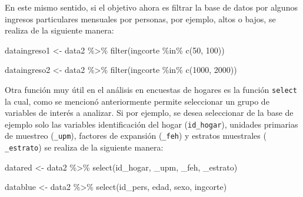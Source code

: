 \documentclass[
  12pt,
]{book}
\newenvironment{Shaded}{\begin{snugshade}}{\end{snugshade}}
\newcommand{\AttributeTok}[1]{\textcolor[rgb]{0.77,0.63,0.00}{#1}}
\newcommand{\DecValTok}[1]{\textcolor[rgb]{0.00,0.00,0.81}{#1}}
\newcommand{\FunctionTok}[1]{\textcolor[rgb]{0.00,0.00,0.00}{#1}}
\newcommand{\NormalTok}[1]{#1}
\newcommand{\OtherTok}[1]{\textcolor[rgb]{0.56,0.35,0.01}{#1}}
\newcommand{\SpecialCharTok}[1]{\textcolor[rgb]{0.00,0.00,0.00}{#1}}
\newcommand{\StringTok}[1]{\textcolor[rgb]{0.31,0.60,0.02}{#1}}
\begin{document}
En este mismo sentido, si el objetivo ahora es filtrar la base de datos por algunos ingresos particulares mensuales por personas, por ejemplo, altos o bajos, se realiza de la siguiente manera:

\begin{Shaded}
\begin{Highlighting}[]
\NormalTok{dataingreso1 }\OtherTok{\textless{}{-}}\NormalTok{ data2 }\SpecialCharTok{\%\textgreater{}\%} 
  \FunctionTok{filter}\NormalTok{(ingcorte }\SpecialCharTok{\%in\%} \FunctionTok{c}\NormalTok{(}\DecValTok{50}\NormalTok{, }\DecValTok{100}\NormalTok{))}

\NormalTok{dataingreso2 }\OtherTok{\textless{}{-}}\NormalTok{ data2 }\SpecialCharTok{\%\textgreater{}\%} 
  \FunctionTok{filter}\NormalTok{(ingcorte }\SpecialCharTok{\%in\%} \FunctionTok{c}\NormalTok{(}\DecValTok{1000}\NormalTok{, }\DecValTok{2000}\NormalTok{))}
\end{Highlighting}
\end{Shaded}

Otra función muy útil en el análisis en encuestas de hogares es la función \texttt{select} la cual, como se mencionó anteriormente permite seleccionar un grupo de variables de interés a analizar. Si por ejemplo, se desea seleccionar de la base de ejemplo solo las variables identificación del hogar (\texttt{id\_hogar}), unidades primarias de muestreo (\texttt{\_upm}), factores de expansión (\texttt{\_feh}) y estratos muestrales ( \texttt{\_estrato}) se realiza de la siguiente manera:

\begin{Shaded}
\begin{Highlighting}[]
\NormalTok{datared }\OtherTok{\textless{}{-}}\NormalTok{ data2 }\SpecialCharTok{\%\textgreater{}\%} \FunctionTok{select}\NormalTok{(}\StringTok{\textasciigrave{}}\AttributeTok{id\_hogar}\StringTok{\textasciigrave{}}\NormalTok{, }\StringTok{\textasciigrave{}}\AttributeTok{\_upm}\StringTok{\textasciigrave{}}\NormalTok{,}
                            \StringTok{\textasciigrave{}}\AttributeTok{\_feh}\StringTok{\textasciigrave{}}\NormalTok{, }\StringTok{\textasciigrave{}}\AttributeTok{\_estrato}\StringTok{\textasciigrave{}}\NormalTok{)}

\NormalTok{datablue }\OtherTok{\textless{}{-}}\NormalTok{ data2 }\SpecialCharTok{\%\textgreater{}\%} \FunctionTok{select}\NormalTok{(id\_pers, edad, }
\NormalTok{                             sexo, ingcorte)}
\end{Highlighting}
\end{Shaded}
\end{document}
